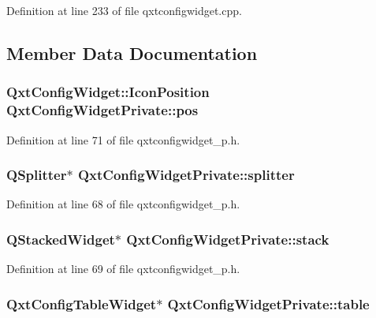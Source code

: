 Definition at line 233 of file qxtconfigwidget.\-cpp.



\subsection{Member Data Documentation}
\hypertarget{class_qxt_config_widget_private_a5ad4cfce6f07cdebb923a193be57c4b1}{
\subsubsection[{pos}]{\setlength{\rightskip}{0pt plus 5cm}Qxt\-Config\-Widget\-::\-Icon\-Position Qxt\-Config\-Widget\-Private\-::pos}}\label{class_qxt_config_widget_private_a5ad4cfce6f07cdebb923a193be57c4b1}


Definition at line 71 of file qxtconfigwidget\-\_\-p.\-h.

\hypertarget{class_qxt_config_widget_private_afed7098d87477fbe733cc187e3ef6290}{
\subsubsection[{splitter}]{\setlength{\rightskip}{0pt plus 5cm}Q\-Splitter$\ast$ Qxt\-Config\-Widget\-Private\-::splitter}}\label{class_qxt_config_widget_private_afed7098d87477fbe733cc187e3ef6290}


Definition at line 68 of file qxtconfigwidget\-\_\-p.\-h.

\hypertarget{class_qxt_config_widget_private_ad3e8fd67c220f068ba9b5eda7dff6538}{
\subsubsection[{stack}]{\setlength{\rightskip}{0pt plus 5cm}Q\-Stacked\-Widget$\ast$ Qxt\-Config\-Widget\-Private\-::stack}}\label{class_qxt_config_widget_private_ad3e8fd67c220f068ba9b5eda7dff6538}


Definition at line 69 of file qxtconfigwidget\-\_\-p.\-h.

\hypertarget{class_qxt_config_widget_private_a1533bc9e1106b1bc31b831c8a6c560fd}{
\subsubsection[{table}]{\setlength{\rightskip}{0pt plus 5cm}Qxt\-Config\-Table\-Widget$\ast$ Qxt\-Config\-Widget\-Private\-::table}}\label{class_qxt_config_widget_private_a1533bc9e1106b1bc31b831c8a6c560fd}


